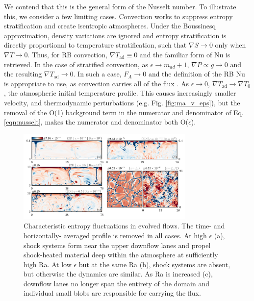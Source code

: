 \documentclass[aps, prl, twocolumn, nofootinbib, groupedaddress, amsfonts, amssymb, amsmath]{revtex4-1}
\newcommand{\grad}{\ensuremath{\nabla}}
\begin{document}
We contend that this is the general form of the Nusselt number.  To illustrate this, we consider a few limiting
cases. Convection works to
suppress entropy stratification and create isentropic atmospheres.  Under the Boussinesq approximation,
density variations are ignored and entropy stratification is directly proportional to temperature stratification,
such that $\grad S \rightarrow 0$ only when $\grad T \rightarrow 0$.  Thus, for RB convection, 
$\grad T_{\text{ad}} \equiv 0$ and the familiar form of Nu is retrieved.  In the case of stratified convection,
as $\epsilon \rightarrow m_{ad} + 1$, $\grad P \propto g \rightarrow 0$ and
the resulting $\grad T_{\text{ad}} \rightarrow 0$.  In such a case, $F_A \rightarrow 0$ and the
definition of the RB Nu is appropriate to use, as convection carries all of the
flux \cite{brandenburg&all2005}. As $\epsilon \rightarrow 0$, 
$\grad T_{\text{ad}}\rightarrow \grad T_0$, the atmospheric initial temperature profile.  This causes increasingly
smaller velocity, and thermodynamic perturbations (e.g. Fig. \ref{fig:ma_v_eps}), but the removal of the 
O(1) background term in the numerator and denominator of Eq. \ref{eqn:nusselt}, makes the numerator and
denominator both O($\epsilon$).

\begin{figure}[b]
\includegraphics[width=3.4375in]{./figs/snapshots_fig.png}
\caption{Characteristic entropy fluctuations in evolved flows. The time- and horizontally-
averaged profile is removed in all cases.  At high
$\epsilon$ (a), shock systems form near the upper downflow lanes and propel shock-heated material deep within
the atmosphere at sufficiently high Ra.  At low $\epsilon$ but at the same Ra (b), shock systems are absent, 
but otherwise the dynamics are similar.  As Ra is increased (c), downflow lanes no longer span
the entirety of the domain and individual small blobs are responsible for carrying the flux.
\label{fig:entropy_snapshots} }
\end{figure}
\end{document}

